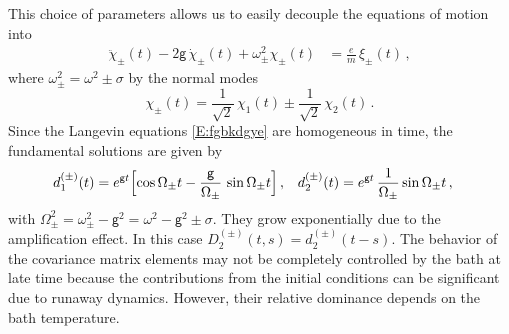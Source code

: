 \documentclass[11pt,a4paper]{article}
\begin{document}
This choice of parameters allows us to easily decouple the equations of motion into
\begin{align}
	\ddot{\chi}_{\pm}(t)-2\mathsf{g}\,\dot{\chi}_{\pm}(t)+\omega^{2}_{\pm}\chi_{\pm}(t)&=\frac{e}{m}\,\xi_{\pm}(t)\,,\label{E:fgbkdgye}
\end{align}
where $\omega_{\pm}^{2}=\omega^{2}\pm\sigma$ by the normal modes
\begin{equation}
	\chi_{\pm}(t)=\frac{1}{\sqrt{2}}\,\chi_{1}(t)\pm\frac{1}{\sqrt{2}}\,\chi_{2}(t)\,.
\end{equation}
Since the Langevin equations \eqref{E:fgbkdgye} are homogeneous in time, the fundamental solutions are given by
\begin{align}
	d_{1}^{(\pm)}(t)&=e^{\mathsf{g}t}\Bigl[\cos\Omega_{\pm}t-\frac{\mathsf{g}}{\Omega_{\pm}}\,\sin\Omega_{\pm}t\Bigr]\,,&d_{2}^{(\pm)}(t)&=e^{\mathsf{g}t}\,\frac{1}{\Omega_{\pm}}\sin\Omega_{\pm}t\,,
\end{align}
with $\Omega_{\pm}^{2}=\omega_{\pm}^{2}-\mathsf{g}^{2}=\omega^{2}-\mathsf{g}^{2}\pm\sigma$. They grow exponentially due to the amplification effect. In this case $D_{2}^{(\pm)}(t,s)=d_{2}^{(\pm)}(t-s)$. The  behavior  of the covariance matrix elements may not be completely controlled by the bath at late time because the contributions from the initial conditions can be significant due to runaway dynamics. However, their relative dominance depends on the bath temperature.
\end{document}
